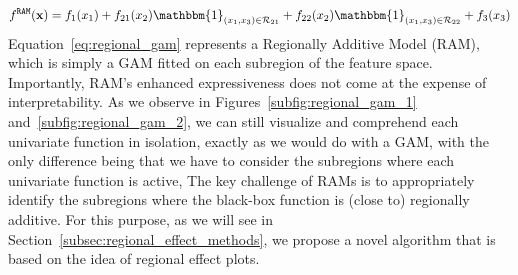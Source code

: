 \documentclass[12pt]{article}
\newcommand{\xb}{\mathbf{x}}
\newcommand{\when}[1]{\mathbbm{1}_{#1}}
\begin{document}
\begin{equation}
    \label{eq:regional_gam}
    f^{\mathtt{RAM}}(\xb) = f_1(x_1) + f_{21}(x_2) \when{(x_1, x_3) \in \mathcal{R}_{21}} + f_{22}(x_2) \when{(x_1, x_3) \in \mathcal{R}_{22}} + f_3(x_3)
\end{equation}
%
Equation~\eqref{eq:regional_gam} represents a Regionally Additive Model (RAM), which is simply a GAM fitted on each subregion of the feature space.
Importantly, RAM's enhanced expressiveness does not come at the expense of interpretability.
As we observe in Figures~\ref{subfig:regional_gam_1} and~\ref{subfig:regional_gam_2}, we can still visualize and comprehend each univariate function in isolation, exactly as we would do with a GAM,
with the only difference being that we have to consider the subregions where each univariate function is active,
The key challenge of RAMs is to appropriately identify the subregions where the black-box function is (close to) regionally additive.
For this purpose, as we will see in Section~\ref{subsec:regional_effect_methods}, we propose a novel algorithm that is based on the idea of
regional effect plots.
\end{document}
